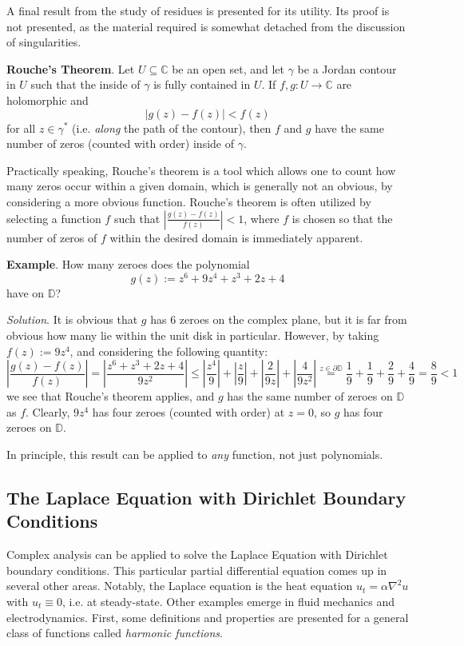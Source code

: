 A final result from the study of residues is presented for its utility. Its proof is not presented, as the material required is somewhat detached from the discussion of singularities.

\textbf{Rouche's Theorem}. Let $U\subseteq\mathbb{C}$ be an open set, and let $\gamma$ be a Jordan contour in $U$ such that the inside of $\gamma$ is fully contained in $U$. If $f,g:U\to\mathbb{C}$ are holomorphic and \[|g(z)-f(z)| < f(z)\] for all $z\in\gamma^*$ (i.e. \textit{along} the path of the contour), then $f$ and $g$ have the same number of zeros (counted with order) inside of $\gamma$.

Practically speaking, Rouche's theorem is a tool which allows one to count how many zeros occur within a given domain, which is generally not an obvious, by considering a more obvious function. Rouche's theorem is often utilized by selecting a function $f$ such that $\left|\frac{g(z)-f(z)}{f(z)}\right| < 1$, where $f$ is chosen so that the number of zeros of $f$ within the desired domain is immediately apparent.

\textbf{Example}. How many zeroes does the polynomial \[g(z) := z^6+9z^4+z^3+2z+4\] have on $\mathbb{D}$?

\textit{Solution}. It is obvious that $g$ has $6$ zeroes on the complex plane, but it is far from obvious how many lie within the unit disk in particular. However, by taking $f(z):=9z^4$, and considering the following quantity: \[\left|\frac{g(z)-f(z)}{f(z)}\right| = \left|\frac{z^6 + z^3 +2z +4}{9z^2}\right| \leq \left|\frac{z^4}{9}\right| + \left|\frac{z}{9}\right| + \left|\frac{2}{9z}\right| + \left|\frac{4}{9z^2}\right| \overset{z\in\partial\mathbb{D}}{=} \frac{1}{9} + \frac{1}{9} + \frac{2}{9} + \frac{4}{9} = \frac{8}{9}<1\] we see that Rouche's theorem applies, and $g$ has the same number of zeroes on $\mathbb{D}$ as $f$. Clearly, $9z^4$ has four zeroes (counted with order) at $z=0$, so $g$ has four zeroes on $\mathbb{D}$.

In principle, this result can be applied to \textit{any} function, not just polynomials.

\subsection{The Laplace Equation with Dirichlet Boundary Conditions}

Complex analysis can be applied to solve the Laplace Equation with Dirichlet boundary conditions. This particular partial differential equation comes up in several other areas. Notably, the Laplace equation is the heat equation $u_t = \alpha \nabla^2 u$ with $u_t\equiv 0$, i.e. at steady-state. Other examples emerge in fluid mechanics and electrodynamics. First, some definitions and properties are presented for a general class of functions called \textit{harmonic functions}.

